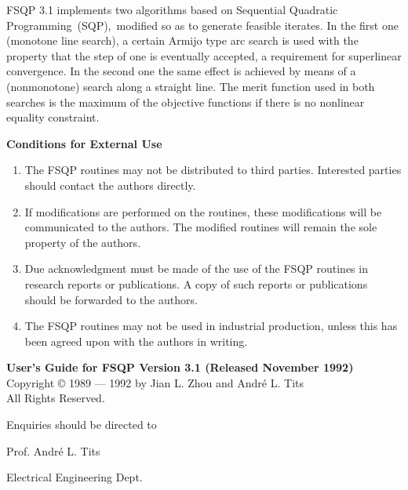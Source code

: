 \begin{titlepage}
\hspace{4mm} FSQP 3.1 implements two algorithms based on Sequential
Quadratic Programming~(SQP),~modified so as to generate
feasible iterates. In the first one (monotone line search), a certain 
Armijo type arc search is used with the property that the step of one
is eventually accepted, a requirement for superlinear convergence.
In the second one the same effect is achieved by means 
of a (nonmonotone) search along a straight line. The merit function
used in both searches is the maximum of the objective functions if
there is no nonlinear equality constraint.
\end{titlepage}

\begin{titlepage}
\centerline{\bf Conditions for External Use}
\bigskip
\begin{enumerate}
\item The FSQP routines may not be distributed to third parties. 
      Interested parties should contact the authors directly.
\item If modifications are performed on the routines, these
      modifications will be communicated to the authors. 
      The modified routines will remain
      the sole property of the authors.
\item Due acknowledgment must be made of the use of the FSQP routines in
      research reports or publications. A copy of such reports or 
      publications should be forwarded to the authors.
\item The FSQP routines may not be used in industrial production,
      unless this has been agreed upon with the authors in writing.
\end{enumerate}

\bigskip\noindent
{\bf User's Guide for FSQP Version 3.1 (Released November 1992)} \\
Copyright {\copyright} 1989 --- 1992 by Jian L. Zhou and Andr\'e L. Tits\\
All Rights Reserved.

\bigskip
\bigskip
\noindent Enquiries should be directed to 

\bigskip
\hspace{5em}Prof. Andr\'e L. Tits

\hspace{5em}Electrical Engineering Dept.


\end{titlepage}
